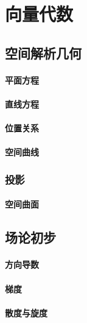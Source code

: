\section{向量代数}

\subsection{空间解析几何}

\paragraph{平面方程}

\paragraph{直线方程}

\paragraph{位置关系}

\paragraph{空间曲线}

\subsubsection{投影}

\paragraph{空间曲面}

\subsection{场论初步}

\paragraph{方向导数}

\paragraph{梯度}

\paragraph{散度与旋度}


